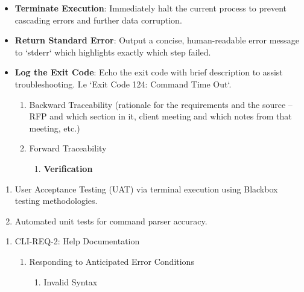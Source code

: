 \begin{itemize}
\item
  \textbf{Terminate Execution}: Immediately halt the current process to
  prevent cascading errors and further data corruption.
\item
  \textbf{Return Standard Error}: Output a concise, human-readable error
  message to `stderr` which highlights exactly which step failed.
\item
  \textbf{Log the Exit Code}: Echo the exit code with brief description
  to assist troubleshooting. I.e `Exit Code 124: Command Time Out`.

  \begin{enumerate}
  \def\labelenumi{\alph{enumi}.}
  \item
    Backward Traceability (rationale for the requirements and the source
    -- RFP and which section in it, client meeting and which notes from
    that meeting, etc.)
  \item
    Forward Traceability

    \begin{enumerate}
    \def\labelenumii{\roman{enumii}.}
    \item
      \textbf{Verification}
    \end{enumerate}
  \end{enumerate}
\end{itemize}

\begin{enumerate}
\def\labelenumi{\arabic{enumi}.}
\item
  User Acceptance Testing (UAT) via terminal execution using Blackbox
  testing methodologies.
\item
  Automated unit tests for command parser accuracy.
\end{enumerate}

\begin{enumerate}
\def\labelenumi{\Roman{enumi})}
\setcounter{enumi}{1}
\item
  CLI-REQ-2: Help Documentation

  \begin{enumerate}
  \def\labelenumii{\alph{enumii}.}
  \item
    Responding to Anticipated Error Conditions

    \begin{enumerate}
    \def\labelenumiii{\roman{enumiii}.}
    \item
      Invalid Syntax
    \end{enumerate}
  \end{enumerate}
\end{enumerate}

